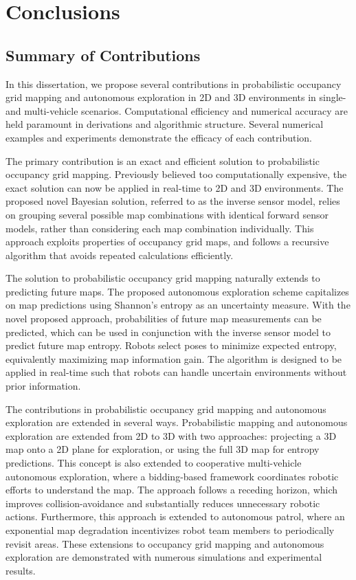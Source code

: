 \chapter{Conclusions}\label{chap:Conclusions}

\section{Summary of Contributions}
In this dissertation, we propose several contributions in probabilistic occupancy grid mapping and autonomous exploration in 2D and 3D environments in single- and multi-vehicle scenarios. Computational efficiency and numerical accuracy are held paramount in derivations and algorithmic structure. Several numerical examples and experiments demonstrate the efficacy of each contribution.

The primary contribution is an exact and efficient solution to probabilistic occupancy grid mapping. Previously believed too computationally expensive, the exact solution can now be applied in real-time to 2D and 3D environments. The proposed novel Bayesian solution, referred to as the inverse sensor model, relies on grouping several possible map combinations with identical forward sensor models, rather than considering each map combination individually. This approach exploits properties of occupancy grid maps, and follows a recursive algorithm that avoids repeated calculations efficiently.

The solution to probabilistic occupancy grid mapping naturally extends to predicting future maps. The proposed autonomous exploration scheme capitalizes on map predictions using Shannon's entropy as an uncertainty measure. With the novel proposed approach, probabilities of future map measurements can be predicted, which can be used in conjunction with the inverse sensor model to predict future map entropy. Robots select poses to minimize expected entropy, equivalently maximizing map information gain. The algorithm is designed to be applied in real-time such that robots can handle uncertain environments without prior information.

The contributions in probabilistic occupancy grid mapping and autonomous exploration are extended in several ways. Probabilistic mapping and autonomous exploration are extended from 2D to 3D with two approaches: projecting a 3D map onto a 2D plane for exploration, or using the full 3D map for entropy predictions. This concept is also extended to cooperative multi-vehicle autonomous exploration, where a bidding-based framework coordinates robotic efforts to understand the map. The approach follows a receding horizon, which improves collision-avoidance and substantially reduces unnecessary robotic actions. Furthermore, this approach is extended to autonomous patrol, where an exponential map degradation incentivizes robot team members to periodically revisit areas. These extensions to occupancy grid mapping and autonomous exploration are demonstrated with numerous simulations and experimental results.

